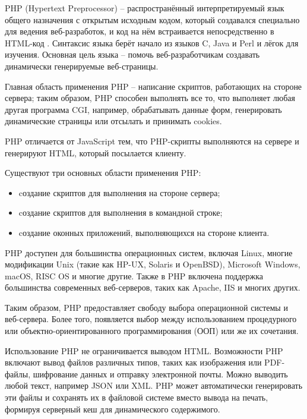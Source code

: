 PHP (Hypertext Preprocessor) -- распространённый интерпретируемый язык общего назначения с открытым исходным кодом, который создавался специально для ведения веб-разработок, и код на нём встраивается непосредственно в HTML-код \cite{php}.  Синтаксис языка берёт начало из языков C, Java и Perl и лёгок для изучения. Основная цель языка -- помочь веб-разработчикам создавать динамически генерируемые веб-страницы. 

Главная область применения PHP -- написание скриптов, работающих на стороне сервера; таким образом, PHP способен выполнять все то, что выполняет любая другая программа CGI, например, обрабатывать данные форм, генерировать динамические страницы или отсылать и принимать cookies. 

PHP отличается от JavaScript тем, что PHP-скрипты выполняются на сервере и генерируют HTML, который посылается клиенту. 

Существуют три основных области применения PHP:
\begin{itemize}
	\item cоздание скриптов для выполнения на стороне сервера;
	\item cоздание скриптов для выполнения в командной строке;
	\item cоздание оконных приложений, выполняющихся на стороне клиента.
\end{itemize}

PHP доступен для большинства операционных систем, включая Linux, многие модификации Unix (такие как HP-UX, Solaris и OpenBSD), Microsoft Windows, macOS, RISC OS и многие другие. Также в PHP включена поддержка большинства современных веб-серверов, таких как Apache, IIS и многих других.

Таким образом, PHP предоставляет свободу выбора операционной системы и веб-сервера. Более того, появляется выбор между использованием процедурного или объектно-ориентированного программирования (ООП) или же их сочетания.

Использование PHP не ограничивается выводом HTML. Возможности PHP включают вывод файлов различных типов, таких как изображения или PDF-файлы, шифрование данных и отправку электронной почты. Можно выводить любой текст, например JSON или XML. PHP может автоматически генерировать эти файлы и сохранять их в файловой системе вместо вывода на печать, формируя серверный кеш для динамического содержимого.

